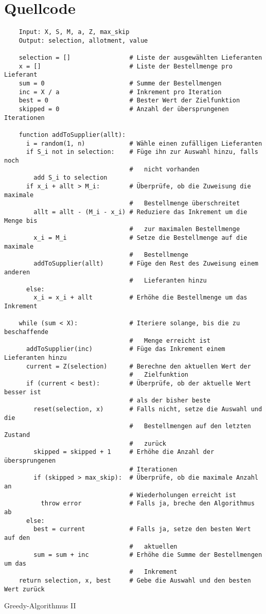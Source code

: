 \section{Quellcode}\label{sec:sourcecode}

\begin{longlisting}
  \begin{verbatim}
    Input: X, S, M, a, Z, max_skip
    Output: selection, allotment, value
  
    selection = []                # Liste der ausgewählten Lieferanten
    x = []                        # Liste der Bestellmenge pro Lieferant
    sum = 0                       # Summe der Bestellmengen
    inc = X / a                   # Inkrement pro Iteration
    best = 0                      # Bester Wert der Zielfunktion
    skipped = 0                   # Anzahl der übersprungenen Iterationen
  
    function addToSupplier(allt):
      i = random(1, n)            # Wähle einen zufälligen Lieferanten
      if S_i not in selection:    # Füge ihn zur Auswahl hinzu, falls noch 
                                  #   nicht vorhanden
        add S_i to selection
      if x_i + allt > M_i:        # Überprüfe, ob die Zuweisung die maximale 
                                  #   Bestellmenge überschreitet
        allt = allt - (M_i - x_i) # Reduziere das Inkrement um die Menge bis 
                                  #   zur maximalen Bestellmenge
        x_i = M_i                 # Setze die Bestellmenge auf die maximale 
                                  #   Bestellmenge
        addToSupplier(allt)       # Füge den Rest des Zuweisung einem anderen 
                                  #   Lieferanten hinzu
      else:
        x_i = x_i + allt          # Erhöhe die Bestellmenge um das Inkrement
  
    while (sum < X):              # Iteriere solange, bis die zu beschaffende 
                                  #   Menge erreicht ist
      addToSupplier(inc)          # Füge das Inkrement einem Lieferanten hinzu
      current = Z(selection)      # Berechne den aktuellen Wert der 
                                  #   Zielfunktion
      if (current < best):        # Überprüfe, ob der aktuelle Wert besser ist 
                                  # als der bisher beste
        reset(selection, x)       # Falls nicht, setze die Auswahl und die
                                  #   Bestellmengen auf den letzten Zustand 
                                  #   zurück
        skipped = skipped + 1     # Erhöhe die Anzahl der übersprungenen
                                  # Iterationen
        if (skipped > max_skip):  # Überprüfe, ob die maximale Anzahl an
                                  # Wiederholungen erreicht ist
          throw error             # Falls ja, breche den Algorithmus ab
      else:
        best = current            # Falls ja, setze den besten Wert auf den 
                                  #   aktuellen
        sum = sum + inc           # Erhöhe die Summe der Bestellmengen um das 
                                  #   Inkrement
    return selection, x, best     # Gebe die Auswahl und den besten Wert zurück
  \end{verbatim}
  \caption{Greedy-Algorithmus II}\label{lst:greedy2}
\end{longlisting}